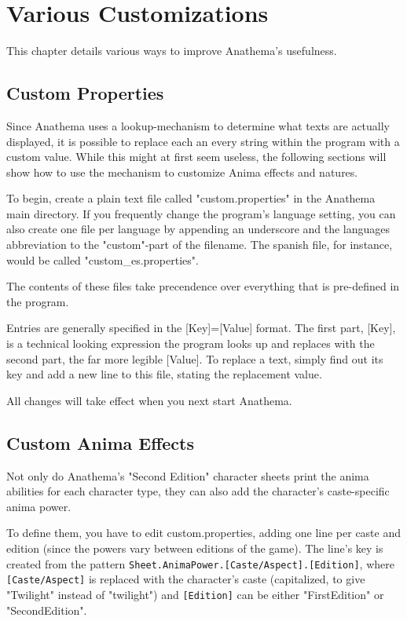 \chapter{Various Customizations}

This chapter details various ways to improve Anathema's usefulness.

\section{Custom Properties}
Since Anathema uses a lookup-mechanism to determine what texts are actually displayed, it is possible to replace each an every string within the program with a custom value. While this might at first seem useless, the following sections will show how to use the mechanism to customize Anima effects and natures.

To begin, create a plain text file called "custom.properties" in the Anathema main directory. If you frequently change the program's language setting, you can also create one file per language by appending an underscore and the languages abbreviation to the "custom"-part of the filename. The spanish file, for instance, would be called "custom\_es.properties".

The contents of these files take precendence over everything that is pre-defined in the program.

Entries are generally specified in the [Key]=[Value] format. The first part, [Key], is a technical looking expression the program looks up and replaces with the second part, the far more legible [Value]. To replace a text, simply find out its key and add a new line to this file, stating the replacement value.

All changes will take effect when you next start Anathema.

\section{Custom Anima Effects}
Not only do Anathema's "Second Edition" character sheets print the anima abilities for each character type, they can also add the character's caste-specific anima power.

To define them, you have to edit custom.properties, adding one line per caste and edition (since the powers vary between editions of the game). The line's key is created from the pattern \texttt{Sheet.AnimaPower.[Caste/Aspect].[Edition]}, where \texttt{[Caste/Aspect]} is replaced with the character's caste (capitalized, to give "Twilight" instead of "twilight") and \texttt{[Edition]} can be either "FirstEdition" or "SecondEdition".

